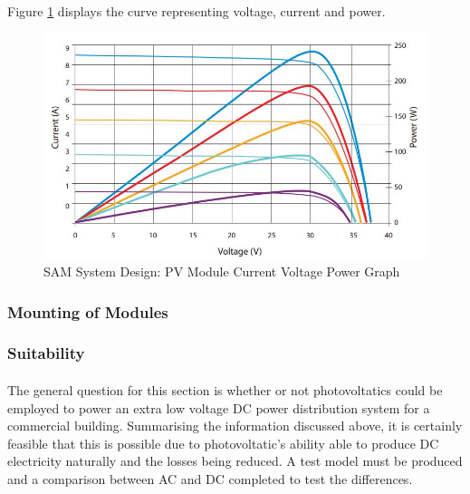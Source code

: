 \paragraph{}
Figure \ref{fig:PV-Module-Spec-Graph} displays the curve representing voltage, current and power.

\begin{figure}[H]
	\hfill\includegraphics[width = 120mm]{images/sam/pv-module-current-voltage-graph}\hspace*{\fill}
	\caption{SAM System Design: PV Module Current Voltage Power Graph \cite{website:SuntechModule}} 
	\label{fig:PV-Module-Spec-Graph}
\end{figure}


\subsubsection{Mounting of Modules}

\paragraph{}



\subsubsection{Suitability}

\paragraph{}
The general question for this section is whether or not photovoltatics could be employed to power an extra low voltage DC power distribution system for a commercial building. Summarising the information discussed above, it is certainly feasible that this is possible due to photovoltatic's ability able to produce DC electricity naturally and the losses being reduced. A test model must be produced and a comparison between AC and DC completed to test the differences.  
